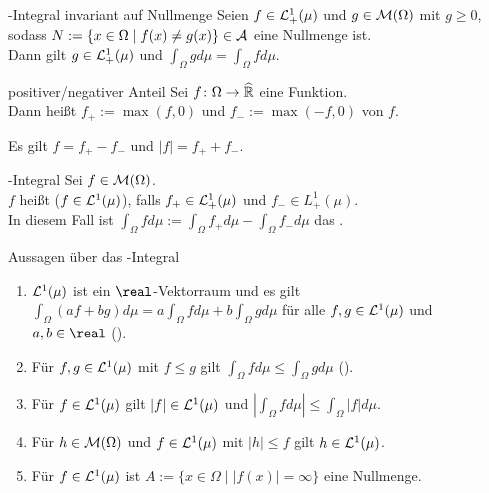 \begin{Satz}{-Integral invariant auf Nullmenge}
    Seien $f \in \mathcal{L}^1_+(\mu)$ und $g \in \mathcal{M}(\Omega)$ mit $g \ge 0$,
    sodass $N := \{x \in \Omega \;|\; f(x) \not= g(x)\} \in \mathcal{A}$ eine Nullmenge ist.\\
    Dann gilt $g \in \mathcal{L}^1_+(\mu)$ und $\int_\Omega g d\mu = \int_\Omega f d\mu$.
\end{Satz}

\linie
\pagebreak

\begin{Def}{positiver/negativer Anteil}
    Sei $f\colon \Omega \rightarrow \widehat{\mathbb{R}}$ eine Funktion.\\
    Dann heißt $f_+ := \max(f, 0)$  und
    $f_- := \max(-f, 0)$  von $f$.
\end{Def}

\begin{Bem}
    Es gilt $f = f_+ - f_-$ und $|f| = f_+ + f_-$.
\end{Bem}

\begin{Def}{-Integral}
    Sei $f \in \mathcal{M}(\Omega)$.\\
    $f$ heißt  ($f \in \mathcal{L}^1(\mu)$), falls
    $f_+ \in \mathcal{L}^1_+(\mu)$ und $f_- \in L^1_+(\mu)$.\\
    In diesem Fall ist $\int_\Omega f d\mu := \int_\Omega f_+ d\mu - \int_\Omega f_- d\mu$ das
    .
\end{Def}

\begin{Satz}{Aussagen über das -Integral}
    \begin{enumerate}
        \item
        $\mathcal{L}^1(\mu)$ ist ein $\real$-Vektorraum und es gilt
        $\int_\Omega (af + bg) d\mu = a \int_\Omega f d\mu + b \int_\Omega g d\mu$
        für alle $f, g \in \mathcal{L}^1(\mu)$ und $a, b \in \real$
        ().
        
        \item
        Für $f, g \in \mathcal{L}^1(\mu)$ mit $f \le g$ gilt
        $\int_\Omega f d\mu \le \int_\Omega g d\mu$
        ().
        
        \item
        Für $f \in \mathcal{L}^1(\mu)$ gilt $|f| \in \mathcal{L}^1(\mu)$ und
        $\left|\int_\Omega f d\mu\right| \le \int_\Omega |f| d\mu$.
        
        \item
        Für $h \in \mathcal{M}(\Omega)$ und $f \in \mathcal{L}^1(\mu)$ mit $|h| \le f$ gilt
        $h \in \mathcal{L}^1(\mu)$.
        
        \item
        Für $f \in \mathcal{L}^1(\mu)$ ist $A := \{x \in \Omega \;|\; |f(x)| = \infty\}$ eine Nullmenge.
    \end{enumerate}
\end{Satz}

